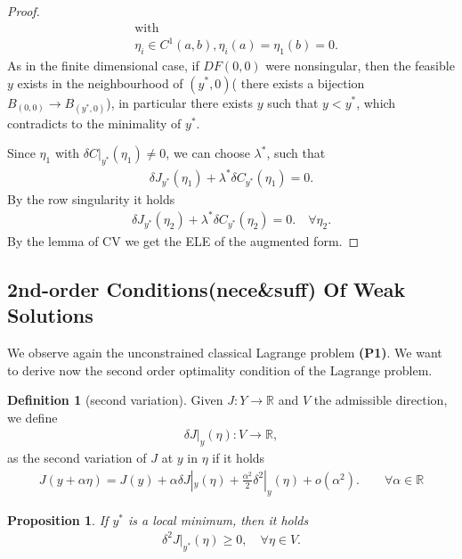 \documentclass[a4paper,11pt,fleqn]{book}
\newtheorem{proposition}[theorem]{Proposition}
\theoremstyle{definition}
\newtheorem{definition}{Definition}[section]
\theoremstyle{remark}
\begin{document}
\begin{proof}
\begin{align*}
		&\text{with}\\
		& \eta_i \in C^1(a, b), \eta_i(a) = \eta_1(b) = 0.   
	\end{align*} 
		As in the finite dimensional case, if $DF(0, 0)$ were nonsingular, then the feasible $y$ exists in the neighbourhood of $(y^*, 0)$( there exists a bijection $B_{(0, 0)} \rightarrow B_{(y^*, 0)}$), in particular there exists $y$ such that $y < y^*$, which contradicts to the minimality of $y^*$.\par 
		Since $\eta_1$ with $\delta C|_{y^*}(\eta_1) \neq 0$, we can choose $\lambda^*$, such that
	\begin{align*}
		\delta J_{y^*}(\eta_1) + \lambda^* \delta C_{y^*}(\eta_1) = 0. 
	\end{align*}
	By the row singularity it holds
	\begin{align*}
		\delta J_{y^*}(\eta_2) + \lambda^* \delta C_{y^*}(\eta_2) = 0. \quad \forall \eta_2. 
	\end{align*}
	By the lemma of CV we get the ELE of the augmented form.
\end{proof}

\subsection{2nd-order Conditions(nece\&suff) Of Weak Solutions}
We observe again the unconstrained classical Lagrange problem \textbf{(P1)}. We want to derive now the second order optimality condition of the Lagrange problem.

\begin{definition}[second variation]
Given $J: Y \rightarrow \mathbb{R}$ and $V$ the admissible direction, we define 
\begin{align*}
	\delta J|_y(\eta): V \rightarrow \mathbb{R}, 
\end{align*}
	as the second variation of $J$ at $y$ in $\eta$ if it holds
	\begin{align*}
		J(y + \alpha \eta) = J(y) + \alpha \delta J|_y(\eta) + \frac{\alpha^2}{2}\delta^2|_y(\eta) + o(\alpha^2). \qquad \forall \alpha \in \mathbb{R}
	\end{align*}
\end{definition}

\begin{proposition}
	If $y^*$ is a local minimum, then it holds
	\begin{align*}
		\delta^2 J|_{y^*} (\eta) \ge 0, \quad \forall \eta \in V. 
	\end{align*}
\end{proposition}
\end{document}
